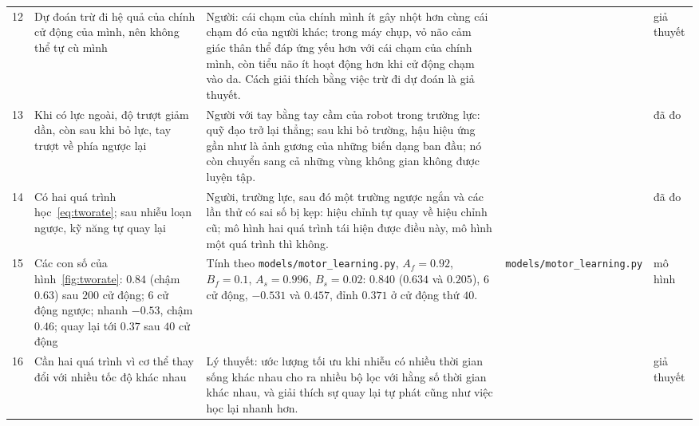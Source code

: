 {\begin{longtable}{>{\raggedright}p{0.5cm}>{\raggedright}p{4.0cm}>{\raggedright}p{5.6cm}>{\raggedright}p{2.3cm}>{\raggedright\arraybackslash}p{1.7cm}}
12 & Dự đoán trừ đi hệ quả của chính cử động của mình, nên không thể tự cù mình & Người: cái chạm của chính mình ít gây nhột hơn cùng cái chạm đó của người khác; trong máy chụp, vỏ não cảm giác thân thể đáp ứng yếu hơn với cái chạm của chính mình, còn tiểu não ít hoạt động hơn khi cử động chạm vào da. Cách giải thích bằng việc trừ đi dự đoán là giả thuyết. & \cite{Blakemore1998} & giả thuyết \\
13 & Khi có lực ngoài, độ trượt giảm dần, còn sau khi bỏ lực, tay trượt về phía ngược lại & Người với tay bằng tay cầm của robot trong trường lực: quỹ đạo trở lại thẳng; sau khi bỏ trường, hậu hiệu ứng gần như là ảnh gương của những biến dạng ban đầu; nó còn chuyển sang cả những vùng không gian không được luyện tập. & \cite{ShadmehrMussaIvaldi1994} & đã đo \\
14 & Có hai quá trình học~\eqref{eq:tworate}; sau nhiễu loạn ngược, kỹ năng tự quay lại & Người, trường lực, sau đó một trường ngược ngắn và các lần thử có sai số bị kẹp: hiệu chỉnh tự quay về hiệu chỉnh cũ; mô hình hai quá trình tái hiện được điều này, mô hình một quá trình thì không. & \cite{Smith2006} & đã đo \\
15 & Các con số của hình~\ref{fig:tworate}: $0.84$ (chậm $0.63$) sau $200$ cử động; $6$ cử động ngược; nhanh $-0.53$, chậm $0.46$; quay lại tới $0.37$ sau $40$ cử động & Tính theo \texttt{models/\allowbreak motor\_\allowbreak learning.py}, $A_f=0.92$, $B_f=0.1$, $A_s=0.996$, $B_s=0.02$: $0.840$ ($0.634$ và $0.205$), $6$ cử động, $-0.531$ và $0.457$, đỉnh $0.371$ ở cử động thứ $40$. & \texttt{models/\allowbreak motor\_\allowbreak learning.py} & mô hình \\
16 & Cần hai quá trình vì cơ thể thay đổi với nhiều tốc độ khác nhau & Lý thuyết: ước lượng tối ưu khi nhiễu có nhiều thời gian sống khác nhau cho ra nhiều bộ lọc với hằng số thời gian khác nhau, và giải thích sự quay lại tự phát cũng như việc học lại nhanh hơn. & \cite{Kording2007} & giả thuyết \\
\bottomrule
\end{longtable}}
